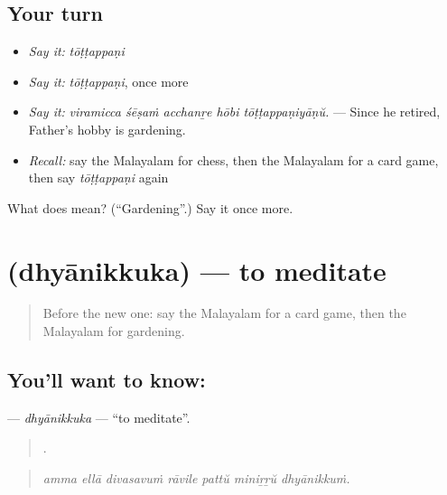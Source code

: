 \subsection*{Your turn}
\begin{itemize}
\raggedright
  \item \emph{Say it:} \emph{tōṭṭappaṇi}
  \item \emph{Say it:} \emph{tōṭṭappaṇi}, once more
  \item \emph{Say it:} \emph{viramicca śēṣaṁ acchanṟe hōbi tōṭṭappaṇiyāṇŭ.} — Since he retired, Father's hobby is gardening.
  \item \emph{Recall:} say the Malayalam for chess, then the Malayalam for a card game, then say \emph{tōṭṭappaṇi} again
\end{itemize}

\begin{tcolorbox}[breakable,colback=teal!4,colframe=teal!35!black,title={Before you move on}]
What does  mean? (\textquotedblleft{}Gardening\textquotedblright{}.) Say it once more.
\end{tcolorbox}
\section[\texorpdfstring{\ml{ധ്യാനിക്കുക} (dhyānikkuka)}{ധ്യാനിക്കുക (dhyānikkuka)}]{ (dhyānikkuka) — to meditate}

\label{lesson:ML-C566-dhyanikkuka}



\begin{quote}
Before the new one: say the Malayalam for a card game, then the Malayalam for gardening.
\end{quote}

\subsection*{You'll want to know: }
\textbf{} — \emph{dhyānikkuka} — \textquotedblleft{}to meditate\textquotedblright{}.

\begin{quote}
      .
\end{quote}

\begin{quote}
\emph{amma ellā divasavuṁ rāvile pattŭ miniṟṟŭ dhyānikkuṁ.}
\end{quote}

